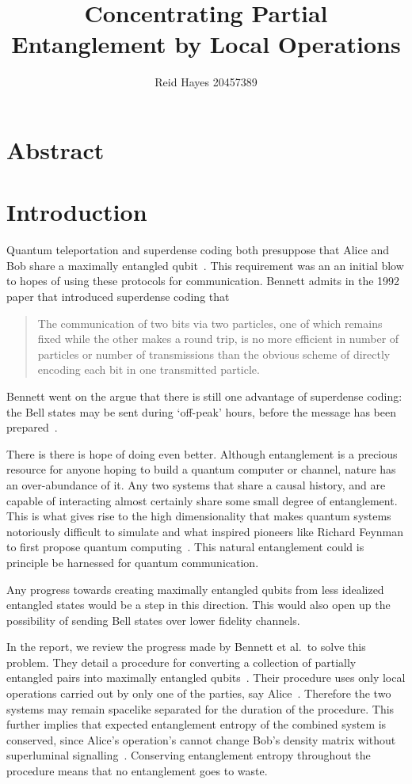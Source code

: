 \documentclass[12pt,letterpaper]{article}
\author{Reid Hayes 20457389}
\title{Concentrating Partial Entanglement by Local Operations}
\begin{document}
\maketitle
\section{Abstract}
\section{Introduction}
Quantum teleportation and superdense coding both presuppose that Alice and Bob share a maximally entangled qubit~\cite{barrett2004teleportation, bennett1992superdense}. 
This requirement was an an initial blow to hopes of using these protocols for communication.
Bennett admits in the 1992 paper that introduced superdense coding that

\hyphenblockcquote{UKenglish}{bennett1992superdense}{
The communication of two bits via two particles, one of which remains fixed while the other makes a round trip, is no more efficient in number of particles or number of transmissions than the obvious scheme of directly encoding each bit in one transmitted particle.
}

Bennett went on the argue that there is still one advantage of superdense coding: the Bell states may be sent during `off-peak' hours, before the message has been prepared~\cite{bennett1992superdense}.

There is there is hope of doing even better.
Although entanglement is a precious resource for anyone hoping to build a quantum computer or channel, nature has an over-abundance of it. 
Any two systems that share a causal history, and are capable of interacting almost certainly share some small degree of entanglement.
This is what gives rise to the high dimensionality that makes quantum systems notoriously difficult to simulate and what inspired pioneers like Richard Feynman to first propose quantum computing~\cite{feynman1982simulating}.
This natural entanglement could is principle be harnessed for quantum communication.

Any progress towards creating maximally entangled qubits from less idealized entangled states would be a step in this direction.
This would also open up the possibility of sending Bell states over lower fidelity channels.

In the report, we review the progress made by Bennett et al.\ to solve this problem.
They detail a procedure for converting a collection of partially entangled pairs into maximally entangled qubits~\cite{bennett1996concentrating}.
Their procedure uses only local operations carried out by only one of the parties, say Alice~\cite{bennett1996concentrating}. Therefore the two systems may remain spacelike separated for the duration of the procedure.
This further implies that expected entanglement entropy of the combined system is conserved, since Alice's operation's cannot change Bob's density matrix without superluminal signalling~\cite{bennett1996concentrating}. Conserving entanglement entropy throughout the procedure means that no entanglement goes to waste.
\end{document}
